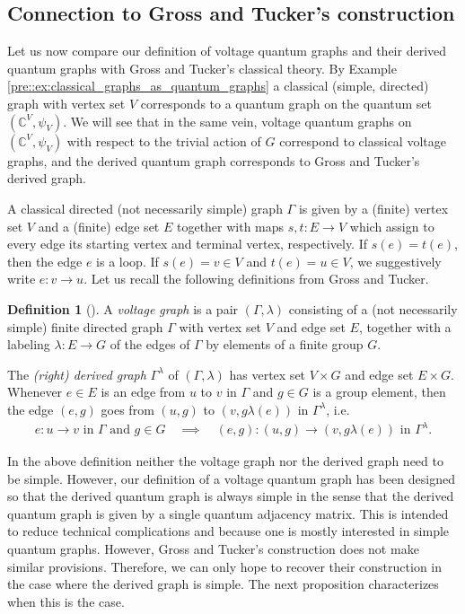 \documentclass{amsart}
\newcommand{\C}{\mathbb{C}}
\theoremstyle{definition}
\newtheorem{definition}[thm]{Definition}
\theoremstyle{definition}
\begin{document}
\subsection{Connection to Gross and Tucker's construction}

Let us now compare our definition of voltage quantum graphs and their derived quantum graphs with Gross and Tucker's classical theory. By Example \ref{pre::ex:classical_graphs_as_quantum_graphs} a classical (simple, directed) graph with vertex set $V$ corresponds to a quantum graph on the quantum set $(\C^V, \psi_V)$. We will see that in the same vein, voltage quantum graphs on $(\C^V, \psi_V)$ with respect to the trivial action of $\hat{G}$ correspond to classical voltage graphs, and the derived quantum graph corresponds to Gross and Tucker's derived graph.

A classical directed (not necessarily simple) graph $\Gamma$ is given by a (finite) vertex set $V$ and a (finite) edge set $E$ together with maps $s, t: E \to V$ which assign to every edge its starting vertex and terminal vertex, respectively. If $s(e) = t(e)$, then the edge $e$ is a loop. If $s(e) = v \in V$ and $t(e) = u \in V$, we suggestively write $e: v {\to} u$.
Let us recall the following definitions from Gross and Tucker.

\begin{definition}[{\cite[Section 2.1.1]{gross_topological_1987}}]
    A \emph{voltage graph} is a pair $(\Gamma, \lambda)$ consisting of a (not necessarily simple) finite directed graph $\Gamma$ with vertex set $V$ and edge set $E$, together with a labeling $\lambda: E \to G$ of the edges of $\Gamma$ by elements of a finite group $G$.

    The \emph{(right) derived graph} $\Gamma^\lambda$ of $(\Gamma, \lambda)$ has vertex set $V \times G$ and edge set $E \times G$. Whenever $e \in E$ is an edge from $u$ to $v$ in $\Gamma$ and $g \in G$ is a group element, then the edge $(e,g)$ goes from $(u,g)$ to $(v, g \lambda(e))$ in $\Gamma^\lambda$, i.e.
    \begin{align*}
        e: u \to v \text{ in } \Gamma \text{ and } g \in G
        \quad \implies \quad
        (e,g): (u,g) \to (v, g \lambda(e)) \text{ in } \Gamma^\lambda.
    \end{align*}
\end{definition}


In the above definition neither the voltage graph nor the derived graph need to be simple.
However, our definition of a voltage quantum graph has been designed so that the derived quantum graph is always simple in the sense that the derived quantum graph is given by a single quantum adjacency matrix. This is intended to reduce technical complications and because one is mostly interested in simple quantum graphs. However, Gross and Tucker's construction does not make similar provisions. Therefore, we can only hope to recover their construction in the case where the derived graph is simple. The next proposition characterizes when this is the case.
\end{document}
